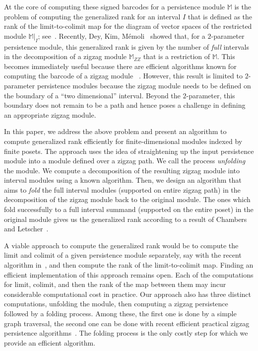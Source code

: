\documentclass[11pt]{article}
\theoremstyle{plain}%
\newcommand{\M}{\mathbb{M}}
\begin{document}
At the core of computing these signed barcodes for a persistence module $\M$ is the
problem of computing the generalized rank for an interval $I$ that is defined as
the rank of the limit-to-colimit map for the diagram of vector spaces of the restricted module $\M|_I$; see~\cite{kim2018generalized}. Recently,
Dey, Kim, M\'{e}moli~\cite{DKM22} showed that, for a $2$-parameter persistence module,
this generalized rank is given by the number of \emph{full} intervals in the
decomposition of a zigzag module $\M_{ZZ}$ that is a restriction of $\M$.
This becomes immediately useful because there are efficient algorithms
known for computing the barcode of a zigzag module
~\cite{DH22,DHM25, maria2014zigzag,milosavljevic2011zigzag}. 
However,
this result is limited to $2$-parameter persistence modules because
the zigzag module needs to be defined on the
boundary of a ``two dimensional'' interval. Beyond the $2$-parameter, this boundary does not remain
to be a path and hence poses a challenge in defining an appropriate zigzag module.

In this paper, we address the above problem and present
an algorithm to compute generalized
rank efficiently for finite-dimensional modules indexed by finite posets. The approach
uses the idea of straightening up
the input persistence module into a module defined over a zigzag path.
We call the process {\em unfolding} the module. We compute a decomposition 
of the resulting zigzag module into interval modules using a known algorithm.
Then, we design an algorithm that aims to
\emph{fold} the full interval modules (supported on entire zigzag path) in the
decomposition of the zigzag module back to the original module.
The ones which fold successfully to a full interval summand (supported on the entire poset) in the
original module gives us the generalized rank 
according to a result of Chambers and Letscher~\cite{chambers2018persistent}.

A viable approach to compute the generalized rank would be to compute the
limit and colimit of a given persistence module separately, say with
the recent algorithm in~\cite{SHN23}, and then
compute the rank of the limit-to-colimit map. Finding an efficient
implementation of this approach remains open. Each of the 
computations for limit, colimit, and then the rank of the map between them
may incur considerable computational cost
in practice. Our approach also has three distinct computations, unfolding the
module, then computing a zigzag persistence followed by a folding process.
Among these, the first one is done by a simple graph traversal, the second one
can be done with recent efficient practical zigzag persistence algorithms~\cite{DH22,DHM25}. The folding process is the
only costly step for which we provide an efficient algorithm.
\end{document}
